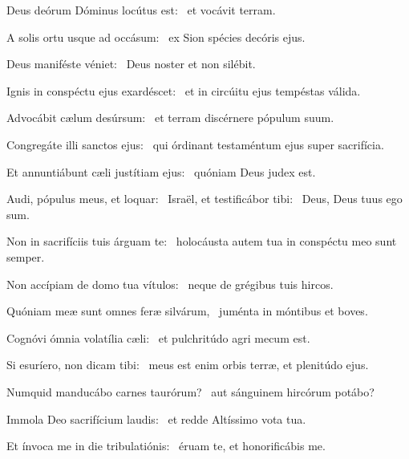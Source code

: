 \item Deus deórum Dóminus locútus est:~\psstar{} et vocávit terram.

\item A solis ortu usque ad occásum:~\psstar{} ex Sion spécies decóris ejus.

\item Deus maniféste véniet:~\psstar{} Deus noster et non silébit.

\item Ignis in conspéctu ejus exardéscet:~\psstar{} et in circúitu ejus tempéstas válida.

\item Advocábit cælum desúrsum:~\psstar{} et terram discérnere pópulum suum.

\item Congregáte illi sanctos ejus:~\psstar{} qui órdinant testaméntum ejus super sacrifícia.

\item Et annuntiábunt cæli justítiam ejus:~\psstar{} quóniam Deus judex est.

\item Audi, pópulus meus, et loquar:~\pscross{} Israël, et testificábor tibi:~\psstar{} Deus, Deus tuus ego sum.

\item Non in sacrifíciis tuis árguam te:~\psstar{} holocáusta autem tua in conspéctu meo sunt semper.

\item Non accípiam de domo tua vítulos:~\psstar{} neque de grégibus tuis hircos.

\item Quóniam meæ sunt omnes feræ silvárum,~\psstar{} juménta in móntibus et boves.

\item Cognóvi ómnia volatília cæli:~\psstar{} et pulchritúdo agri mecum est.

\item Si esuríero, non dicam tibi:~\psstar{} meus est enim orbis terræ, et plenitúdo ejus.

\item Numquid manducábo carnes taurórum?~\psstar{} aut sánguinem hircórum potábo?

\item Immola Deo sacrifícium laudis:~\psstar{} et redde Altíssimo vota tua.

\item Et ínvoca me in die tribulatiónis:~\psstar{} éruam te, et honorificábis me.
